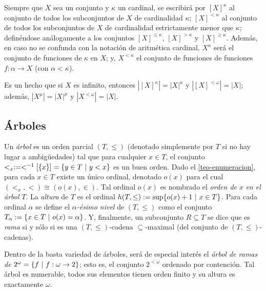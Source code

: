     \index[sym]{$[X]^\kappa$}\index[sym]{$[X]^{<\kappa}$}\index[sym]{$[X]^{\leq \kappa}$}\index[sym]{$[X]^{> \kappa}$}\index[sym]{$[X]^{\geq \kappa}$}
    Siempre que $X$ sea un conjunto y $\kappa$ un cardinal, se escribirá por $[X]^\kappa$ al conjunto de todos los subconjuntos de $X$ de cardinalidad $\kappa$; $[X]^{<\kappa}$ al conjunto de todos los subconjuntos de $X$ de cardinalidad estrictamente menor que $\kappa$; definéndose análogamente a los conjuntos $[X]^{\leq \kappa}$, $[X]^{>\kappa}$ y $[X]^{\geq \kappa}$. Además, en caso no se confunda con la notación de aritmética cardinal, $X^\kappa$ será el conjunto de funciones de $\kappa$ en $X$; y, $X^{<\kappa}$ el conjunto de funciones de funciones $f:\alpha \to X$ (con $\alpha < \kappa$).
    
    Es un hecho que si $X$ es infinito, entonces $|[X]^\kappa|=|X|^\kappa$ y $|[X]^{<\omega}|=|X|$; además, $|X^\mu|=|X|^\mu$ y $|X^{<\omega}|=|X|$.

    \subsection{Árboles}

    Un \textit{árbol} es un orden parcial $(T,\leq)$ (denotado simplemente por $T$ si no hay lugar a ambigüedades) tal que para cualquier $x \in T$, el conjunto $<_x:=<^{-1}[\{x\}]=\{y \in T \text{ $|$ } y < x\}$ es un buen orden. Dado el \autoref{teo-enumeracion}, para cada $x \in T$ existe un único ordinal, denotado $o(x)$ para el cual $(<_x,<) \cong (o(x),\in)$. Tal ordinal $o(x)$ es nombrado el \textit{orden de} $x$ \textit{en el árbol} $T$. La \textit{altura} de $T$ es el ordinal $h(T,\leq):=\sup\{o(x) +1 \text{ $|$ } x \in T\}$. Para cada ordinal $\alpha$ se define el $\alpha$\textit{-ésimo nivel} de $(T,\leq)$ como el conjunto $T_\alpha := \{ x \in T \text{ $|$ } o(x) = \alpha \}$. Y, finalmente, un subconjunto $R \subseteq T$ se dice que es \textit{rama} si y sólo si es una $(T,\leq)$-cadena $\subseteq$-maximal (del conjunto de $(T,\leq)$-cadenas).

    Dentro de la basta variedad de árboles, será de especial interés el \textit{árbol de ramas de} $2^\omega=\{f \text{ $|$ } f:\omega \to 2\}$; esto es, el conjunto $2^{<\omega}$ ordenado por contención. Tal árbol es numerable, todos sus elementos tienen orden finito y su altura es exactamente $\omega$.
    
